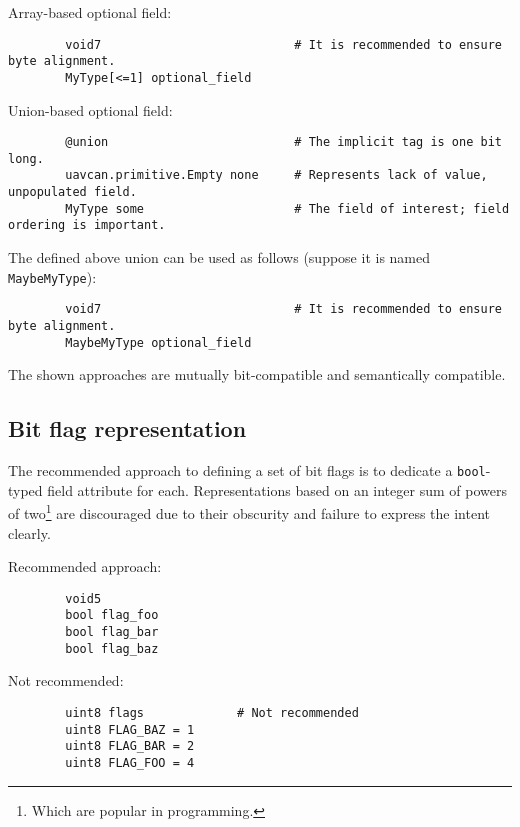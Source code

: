 \begin{remark}
    Array-based optional field:

    \begin{verbatim}
        void7                           # It is recommended to ensure byte alignment.
        MyType[<=1] optional_field
    \end{verbatim}

    Union-based optional field:

    \begin{verbatim}
        @union                          # The implicit tag is one bit long.
        uavcan.primitive.Empty none     # Represents lack of value, unpopulated field.
        MyType some                     # The field of interest; field ordering is important.
    \end{verbatim}

    The defined above union can be used as follows (suppose it is named \verb|MaybeMyType|):

    \begin{verbatim}
        void7                           # It is recommended to ensure byte alignment.
        MaybeMyType optional_field
    \end{verbatim}

    The shown approaches are mutually bit-compatible and semantically compatible.
\end{remark}

\subsection{Bit flag representation}

The recommended approach to defining a set of bit flags is to dedicate a \verb|bool|-typed field attribute for each.
Representations based on an integer sum of powers of two\footnote{Which are popular in programming.}
are discouraged due to their obscurity and failure to express the intent clearly.

\begin{remark}
    Recommended approach:

    \begin{verbatim}
        void5
        bool flag_foo
        bool flag_bar
        bool flag_baz
    \end{verbatim}

    Not recommended:

    \begin{verbatim}
        uint8 flags             # Not recommended
        uint8 FLAG_BAZ = 1
        uint8 FLAG_BAR = 2
        uint8 FLAG_FOO = 4
    \end{verbatim}
\end{remark}
